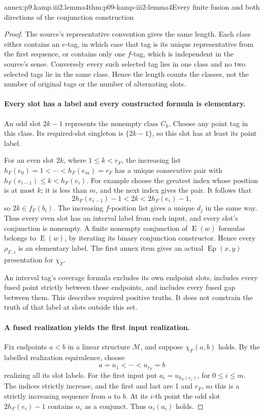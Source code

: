 \begin{annexitem}{annex:p9.kamp.iii2.lemma4}{thm:p09-kamp-iii2-lemma4}{Every finite fusion and both directions of the conjunction construction}
\begin{proof}
The source's representative convention gives the same length. Each
class either contains an \(e\)-tag, in which case that tag is its
unique representative from the first sequence, or contains only one
\(f\)-tag, which is independent in the source's sense. Conversely
every such selected tag lies in one class and no two selected tags
lie in the same class. Hence the length counts the classes, not the
number of original tags or the number of alternating slots.

\paragraph{Every slot has a label and every constructed formula is elementary.}
An odd slot \(2k-1\) represents the nonempty class \(C_k\).
Choose any point tag in this class. Its required-slot singleton is
\(\{2k-1\}\), so this slot has at least its point label.

For an even slot \(2k\), where \(1\leq k<r_F\), the increasing
list
\(h_F(e_0)=1<\cdots<h_F(e_m)=r_F\) has a unique consecutive
pair with
\(h_F(e_{i-1})\leq k<h_F(e_i)\).
For example choose the greatest index whose position is at most \(k\);
it is less than \(m\), and the next index gives the pair.
It follows that
\[
             2h_F(e_{i-1})-1<2k<2h_F(e_i)-1,
\]
so \(2k\in f_F(b_i)\). The increasing \(f\)-position list
gives a unique \(d_j\) in the same way. Thus every even slot has
an interval label from each input, and every slot's conjunction is
nonempty. A finite nonempty conjunction of \(\operatorname{E}(w)\)
formulas belongs to \(\operatorname{E}(w)\), by iterating its binary
conjunction constructor. Hence every \(\rho_{F,s}\) is an elementary
label. The first annex item gives an actual
\(\operatorname{Ep}(x,y)\) presentation for \(\chi_F\).

An interval tag's coverage formula excludes its own endpoint slots,
includes every fused point strictly between those endpoints, and includes
every fused gap between them. This describes required positive truths.
It does not constrain the truth of that label at slots outside this set.

\paragraph{A fused realization yields the first input realization.}
Fix endpoints \(a<b\) in a linear structure \(\mathcal M\), and
suppose \(\chi_F(a,b)\) holds. By the labelled realization equivalence,
choose
\[
                      a=u_1<\cdots<u_{r_F}=b
\]
realizing all its slot labels. For the first input put
\(a_i=u_{h_F(e_i)}\), for \(0\leq i\leq m\).
The indices strictly increase, and the first and last are 1 and
\(r_F\), so this is a strictly increasing sequence from \(a\)
to \(b\). At its \(i\)-th point the odd slot
\(2h_F(e_i)-1\) contains \(\alpha_i\) as a conjunct. Thus
\(\alpha_i(a_i)\) holds.


\end{proof}
\end{annexitem}
